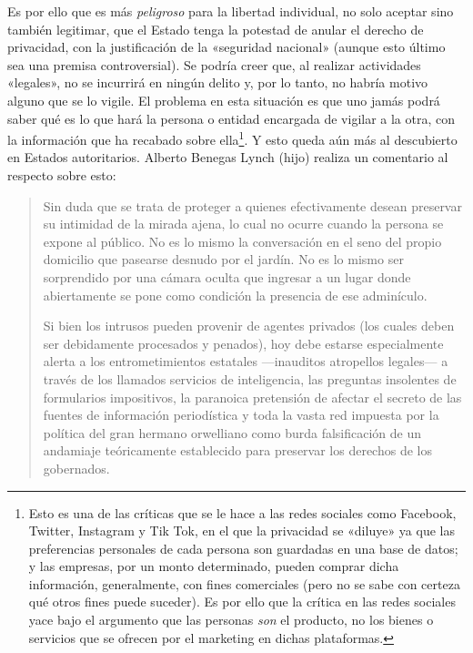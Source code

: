 \documentclass[12pt,a4paper,twoside]{book}
\begin{document}
Es por ello que es más \textit{peligroso} para la libertad individual, no solo aceptar sino también legitimar, que el Estado tenga la potestad de anular el derecho de privacidad, con la justificación de la «seguridad nacional» (aunque esto último sea una premisa controversial). Se podría creer que, al realizar actividades «legales», no se incurrirá en ningún delito y, por lo tanto, no habría motivo alguno que se lo vigile. El problema en esta situación es que uno jamás podrá saber qué es lo que hará la persona o entidad encargada de vigilar a la otra, con la información que ha recabado sobre ella\footnote{Esto es una de las críticas que se le hace a las redes sociales como Facebook, Twitter, Instagram y Tik Tok, en el que la privacidad se «diluye» ya que las preferencias personales de cada persona son guardadas en una base de datos; y las empresas, por un monto determinado, pueden comprar dicha información, generalmente, con fines comerciales (pero no se sabe con certeza qué otros fines puede suceder). Es por ello que la crítica en las redes sociales yace bajo el argumento que las personas \textit{son} el producto, no los bienes o servicios que se ofrecen por el marketing en dichas plataformas.}. Y esto queda aún más al descubierto en Estados autoritarios. Alberto Benegas Lynch (hijo) realiza un comentario al respecto sobre esto:

\begin{quotation}
Sin duda que se trata de proteger a quienes efectivamente desean preservar su intimidad de la mirada ajena, lo cual no ocurre cuando la persona se expone al público. No es lo mismo la conversación en el seno del propio domicilio que pasearse desnudo por el jardín. No es lo mismo ser sorprendido por una cámara oculta que ingresar a un lugar donde abiertamente se pone como condición la presencia de ese adminículo.

Si bien los intrusos pueden provenir de agentes privados (los cuales deben ser debidamente procesados y penados), hoy debe estarse especialmente alerta a los entrometimientos estatales —inauditos atropellos legales— a través de los llamados servicios de inteligencia, las preguntas insolentes de formularios impositivos, la paranoica pretensión de afectar el secreto de las fuentes de información periodística y toda la vasta red impuesta por la política del gran hermano orwelliano como burda falsificación de un andamiaje teóricamente establecido para preservar los derechos de los gobernados. \cite{lynch:privacidad}
\end{quotation}
\end{document}
